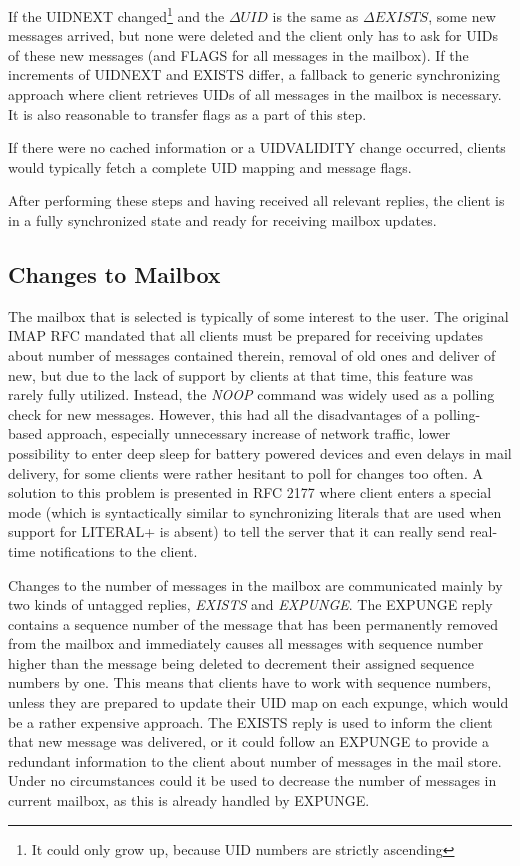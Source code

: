\documentclass[12pt,notitlepage]{report}
\begin{document}
If the UIDNEXT changed\footnote{It could only grow up, because UID numbers are
strictly ascending} and the $\Delta UID$ is the same as $\Delta EXISTS$, some
new messages arrived, but none were deleted and the client only has to ask for
UIDs of these new messages (and FLAGS for all messages in the mailbox).  If the
increments of UIDNEXT and EXISTS differ, a fallback to generic
synchronizing approach where client retrieves UIDs of all messages in the mailbox is
necessary.  It is also reasonable to transfer flags as a part of this step.

If there were no cached information or a UIDVALIDITY change occurred, clients
would typically fetch a complete UID mapping and message flags.

After performing these steps and having received all relevant replies, the
client is in a fully synchronized state and ready for receiving mailbox updates.

\subsection{Changes to Mailbox}

The mailbox that is selected is typically of some interest to the user.  The
original IMAP RFC mandated that all clients must be prepared for receiving
updates about number of messages contained therein, removal of old ones and
deliver of new, but due to the lack of support by clients at that time, this feature
was rarely fully utilized.  Instead, the {\em NOOP} command was widely used as a
polling check for new messages.  However, this had all the disadvantages of a
polling-based approach, especially unnecessary increase of network traffic, lower
possibility to enter deep sleep for battery powered devices and even delays in
mail delivery, for some clients were rather hesitant to poll for changes too
often.  A solution to this problem is presented in RFC 2177 \cite{rfc-idle}
where client enters a special mode (which is syntactically similar to
synchronizing literals that are used when support for LITERAL+
\cite{rfc-literalplus} is absent) to tell the server that it can really send
real-time notifications to the client.

Changes to the number of messages in the mailbox are communicated mainly by two
kinds of untagged replies, {\em EXISTS} and {\em EXPUNGE}.  The EXPUNGE reply
contains a sequence number of the message that has been permanently removed from the
mailbox and immediately causes all messages with sequence number higher than
the message being deleted to decrement their assigned sequence numbers by one.
This means that clients have to work with sequence numbers, unless they are
prepared to update their UID map on each expunge, which would be a rather
expensive approach.  The EXISTS reply is used to inform the client that new message
was delivered, or it could follow an EXPUNGE to provide a redundant information
to the client about number of messages in the mail store.  Under no
circumstances could it be used to decrease the number of messages in current
mailbox, as this is already handled by EXPUNGE.
\end{document}
